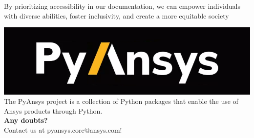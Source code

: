 \documentclass[a0paper,fleqn]{src/betterposter}
\begin{document}
{By prioritizing accessibility in our documentation, we can empower individuals with diverse abilities, 
foster inclusivity, and create a more equitable society

\vfill

\includegraphics[width=\textwidth]{img/general/pyansys_dark}\\
The PyAnsys project is a collection of Python packages that enable the use of Ansys products through Python.
\\
\newline
\textbf{Any doubts?} \\Contact us at pyansys.core@ansys.com!
\\
\newline

}
\end{document}
